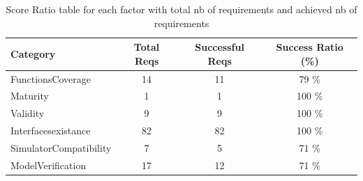 \documentclass{article}
\begin{document}
						\begin{table}
						\centering
						\caption{Score Ratio table for each factor with total nb of requirements and achieved nb of requirements}
						\begin{tabular}{|l|c|c|c|}
						\hline
						Category & Total Reqs & Successful Reqs & Success Ratio (\%) \\
						\hline

							    FunctionsCoverage & 14 & 11 & 79 \% \\
							 

							    Maturity & 1 & 1 & 100 \% \\
							 

							    Validity & 9 & 9 & 100 \% \\
							 

							    Interfacesexistance & 82 & 82 & 100 \% \\
							 

							    SimulatorCompatibility & 7 & 5 & 71 \% \\
							 

							    ModelVerification & 17 & 12 & 71 \% \\
							 
					
						
						\hline
						\end{tabular}
						\end{table}




										
								

			
\end{document}
